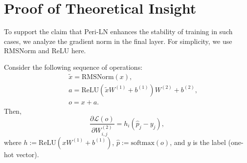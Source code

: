 \newpage

\section{Proof of Theoretical Insight} \label{appendix:theory_proof}

To support the claim that Peri-LN enhances the stability of training in such cases, we analyze the gradient norm in the final layer. For simplicity, we use RMSNorm and ReLU here.

\begin{proposition}
Consider the following sequence of operations:
\begin{align*}
    & \quad \tilde{x} = \mathrm{RMSNorm}(x), \\
    & \quad a = \mathrm{ReLU}(\tilde{x} W^{(1)} + b^{(1)})W^{(2)} + b^{(2)}, \\
    & \quad o = x + a.
\end{align*}
Then,
\begin{equation}
    \frac{\partial \mathcal{L}(o)}{\partial W_{i,j}^{(2)}} = h_{i} (\hat{p}_{j} - y_{j}),  
\end{equation}
where $h := \mathrm{ReLU}\left(x W^{(1)} + b^{(1)}\right)$, $\hat{p} := \mathrm{softmax}(o)$, and $y$ is the label (one-hot vector).
\end{proposition}

